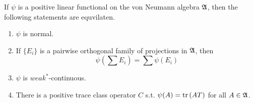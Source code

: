 \begin{thm}
	If $\psi$ is a positive linear functional on the von Neumann algebra $\mathfrak{A}$, then the following statements are equvilaten.
	\begin{enumerate}[label = \arabic*)]
		\item $\psi$ is normal.
		\item If $\{E_i\}$ is a pairwise orthogonal family of projections in $\mathfrak{A}$, then 
		\begin{equation*}
			\psi(\sum E_i) = \sum \psi(E_i)
		\end{equation*}
		\item $\psi$ is $weak^*$-continuous.
		\item There is a positive trace class operator $C$ s.t. $\psi(A) = \operatorname{tr}{(AT)}$ for all $A \in \mathfrak{A}$.
	\end{enumerate}
\end{thm}
